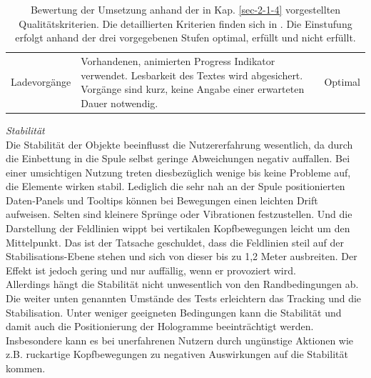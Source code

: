 \begin{landscape}
\begin{table}
\begin{tabular}{m{2.3cm}|m{15.5cm}|m{2cm}}
			\hline
			Ladevorgänge & Vorhandenen, animierten Progress Indikator verwendet. Lesbarkeit des Textes wird abgesichert. Vorgänge sind kurz, keine Angabe einer erwarteten Dauer notwendig. & Optimal\\
		\end{tabular}\caption{\label{tab:tech_results} Bewertung der Umsetzung anhand der in Kap. \ref{sec-2-1-4} vorgestellten Qualitätskriterien. Die detaillierten Kriterien finden sich in \cite{MRDocQuality}. Die Einstufung erfolgt anhand der drei vorgegebenen Stufen optimal, erfüllt und nicht erfüllt.}
	\end{table}
	\egroup
\end{landscape}

\textit{Stabilität}\\
Die Stabilität der Objekte beeinflusst die Nutzererfahrung wesentlich, da durch die Einbettung in die Spule selbst geringe Abweichungen negativ auffallen. Bei einer umsichtigen Nutzung treten diesbezüglich wenige bis keine Probleme auf, die Elemente wirken stabil. Lediglich die sehr nah an der Spule positionierten Daten-Panels und Tooltips können bei Bewegungen einen leichten Drift aufweisen. Selten sind kleinere Sprünge oder Vibrationen festzustellen. Und die Darstellung der Feldlinien wippt bei vertikalen Kopfbewegungen leicht um den Mittelpunkt. Das ist der Tatsache geschuldet, dass die Feldlinien steil auf der Stabilisations-Ebene stehen und sich von dieser bis zu 1,2 Meter ausbreiten. Der Effekt ist jedoch gering und nur auffällig, wenn er provoziert wird.\\

Allerdings hängt die Stabilität nicht unwesentlich von den Randbedingungen ab. Die weiter unten genannten Umstände des Tests erleichtern das Tracking und die Stabilisation. Unter weniger geeigneten Bedingungen kann die Stabilität und damit auch die Positionierung der Hologramme beeinträchtigt werden. Insbesondere kann es bei unerfahrenen Nutzern durch ungünstige Aktionen wie z.B. ruckartige Kopfbewegungen zu negativen Auswirkungen auf die Stabilität kommen.\\

